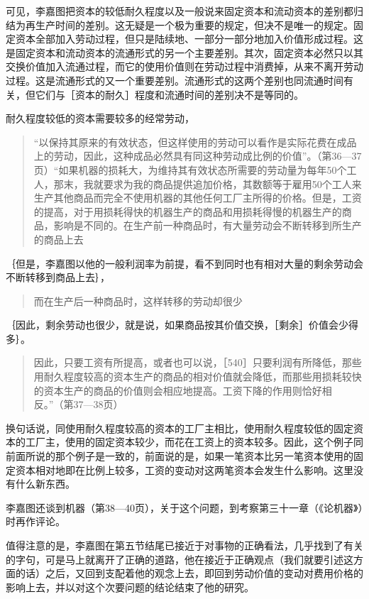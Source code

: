 可见，李嘉图把资本的较低耐久程度以及一般说来固定资本和流动资本的差别都归结为再生产时间的差别。这无疑是一个极为重要的规定，但决不是唯一的规定。固定资本全部加入劳动过程，但只是陆续地、一部分一部分地加入价值形成过程。这是固定资本和流动资本的流通形式的另一个主要差别。其次，固定资本必然只以其交换价值加入流通过程，而它的使用价值则在劳动过程中消费掉，从来不离开劳动过程。这是流通形式的又一个重要差别。流通形式的这两个差别也同流通时间有关，但它们与［资本的耐久］程度和流通时间的差别决不是等同的。

耐久程度较低的资本需要较多的经常劳动，

\begin{quote}{“以保持其原来的有效状态，但这样使用的劳动可以看作是实际花费在成品上的劳动，因此，这种成品必然具有同这种劳动成比例的价值”。（第36—37页）“如果机器的损耗大，为维持其有效状态所需要的劳动量为每年50个工人，那末，我就要求为我的商品提供追加价格，其数额等于雇用50个工人来生产其他商品而完全不使用机器的其他任何工厂主所得的价格。但是，工资的提高，对于用损耗得快的机器生产的商品和用损耗得慢的机器生产的商品，影响是不同的。在生产前一种商品时，有大量劳动会不断转移到所生产的商品上去}\end{quote}

｛但是，李嘉图以他的一般利润率为前提，看不到同时也有相对大量的剩余劳动会不断转移到商品上去｝，

\begin{quote}{而在生产后一种商品时，这样转移的劳动却很少}\end{quote}

｛因此，剩余劳动也很少，就是说，如果商品按其价值交换，［剩余］价值会少得多｝。

\begin{quote}{因此，只要工资有所提高，或者也可以说，［540］只要利润有所降低，那些用耐久程度较高的资本生产的商品的相对价值就会降低，而那些用损耗较快的资本生产的商品的价值则会相应地提高。工资下降的作用则恰好相反。”（第37—38页）}\end{quote}

换句话说，同使用耐久程度较高的资本的工厂主相比，使用耐久程度较低的固定资本的工厂主，使用的固定资本较少，而花在工资上的资本较多。因此，这个例子同前面所说的那个例子是一致的，前面说的是，如果一笔资本比另一笔资本使用的固定资本相对地即在比例上较多，工资的变动对这两笔资本会发生什么影响。这里没有什么新东西。

李嘉图还谈到机器（第38—40页），关于这个问题，到考察第三十一章（《论机器》）时再作评论。

值得注意的是，李嘉图在第五节结尾已接近于对事物的正确看法，几乎找到了有关的字句，可是马上就离开了正确的道路，他在接近于正确观点（我们就要引述这方面的话）之后，又回到支配着他的观念上去，即回到劳动价值的变动对费用价格的影响上去，并以对这个次要问题的结论结束了他的研究。

